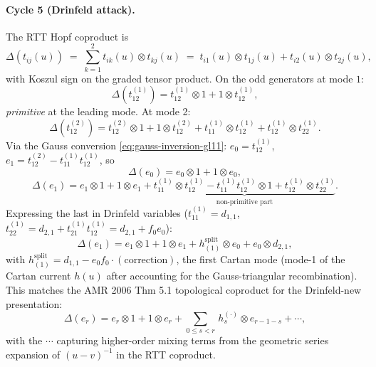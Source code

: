 \paragraph{Cycle 5 (Drinfeld attack).} The RTT Hopf coproduct is
\begin{equation}
\label{eq:coproduct-rtt-gl11}
  \Delta(t_{ij}(u))
  \;=\; \sum_{k=1}^{2} t_{ik}(u) \otimes t_{kj}(u)
  \;=\; t_{i1}(u)\otimes t_{1j}(u) + t_{i2}(u)\otimes t_{2j}(u),
\end{equation}
with Koszul sign on the graded tensor product. On the odd generators
at mode $1$:
\[
  \Delta(t^{(1)}_{12}) = t^{(1)}_{12}\otimes 1 + 1\otimes t^{(1)}_{12},
\]
\emph{primitive} at the leading mode. At mode 2:
\[
  \Delta(t^{(2)}_{12}) = t^{(2)}_{12}\otimes 1 + 1\otimes t^{(2)}_{12}
                        + t^{(1)}_{11}\otimes t^{(1)}_{12}
                        + t^{(1)}_{12}\otimes t^{(1)}_{22}.
\]
Via the Gauss conversion \eqref{eq:gauss-inversion-gl11}: $e_0 =
t^{(1)}_{12}$, $e_1 = t^{(2)}_{12} - t^{(1)}_{11} t^{(1)}_{12}$, so
\[
  \Delta(e_0) = e_0\otimes 1 + 1\otimes e_0,
\]
\[
  \Delta(e_1) = e_1 \otimes 1 + 1\otimes e_1
              + \underbrace{t^{(1)}_{11}\otimes t^{(1)}_{12}
                          - t^{(1)}_{11} t^{(1)}_{12}\otimes 1
                          + t^{(1)}_{12}\otimes t^{(1)}_{22}}
                          _{\text{non-primitive part}}.
\]
Expressing the last in Drinfeld variables ($t^{(1)}_{11} = d_{1,1}$,
$t^{(1)}_{22} = d_{2,1} + t^{(1)}_{21}t^{(1)}_{12} = d_{2,1} + f_0 e_0$):
\[
  \Delta(e_1) = e_1\otimes 1 + 1\otimes e_1
             + h_{(1)}^{\mathrm{split}} \otimes e_0
             + e_0 \otimes d_{2,1},
\]
with $h_{(1)}^{\mathrm{split}} = d_{1,1} - e_0 f_0 \cdot (\text{correction})$,
the first Cartan mode (mode-1 of the Cartan current $h(u)$ after
accounting for the Gauss-triangular recombination). This matches the
AMR 2006 Thm 5.1 topological coproduct for the Drinfeld-new presentation:
\[
  \Delta(e_r) = e_r \otimes 1 + 1 \otimes e_r
              + \sum_{0 \leq s < r}\, h_s^{(\cdot)} \otimes e_{r-1-s}
              + \cdots,
\]
with the $\cdots$ capturing higher-order mixing terms from the
geometric series expansion of $(u-v)^{-1}$ in the RTT coproduct.

